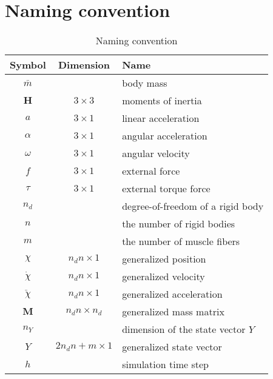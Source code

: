 \documentclass[a4paper,10pt]{article}
\begin{document}
\section{Naming convention}
\begin{table}[h!b!p!]
\caption{Naming convention}
\centering
\begin{tabular}{ c c l }
\hline
Symbol           & Dimension                                & Name \\
\hline
$\bar{m}$        &                                          & body mass \\
$\mathbf{H}$     & $3 \times 3$                             & moments of inertia \\
$a$              & $3 \times 1$                             & linear acceleration \\ 
$\alpha$         & $3 \times 1$                             & angular acceleration \\
$\omega$         & $3 \times 1$                             & angular velocity \\
$f$              & $3 \times 1$                             & external force\\
$\tau$           & $3 \times 1$                             & external torque force\\
$n_d$            &                                          & degree-of-freedom of a rigid body\\
$n$              &                                          & the number of rigid bodies\\
$m$              &                                          & the number of muscle fibers\\
$\chi$           & $n_d n     \times 1$                     & generalized position\\
$\dot\chi$       & $n_d n     \times 1$                     & generalized velocity\\
$\ddot\chi$      & $n_d n     \times 1$                     & generalized acceleration\\
$\mathbf{M}$     & $n_d n     \times n_d$                   & generalized mass matrix\\
$n_Y$            &                                          & dimension of the state vector $Y$\\
$Y$              & $2n_d n + m\times 1$                     & generalized state vector\\
$h$              &                                          & simulation time step\\

\end{tabular}
\end{table}
\end{document}
